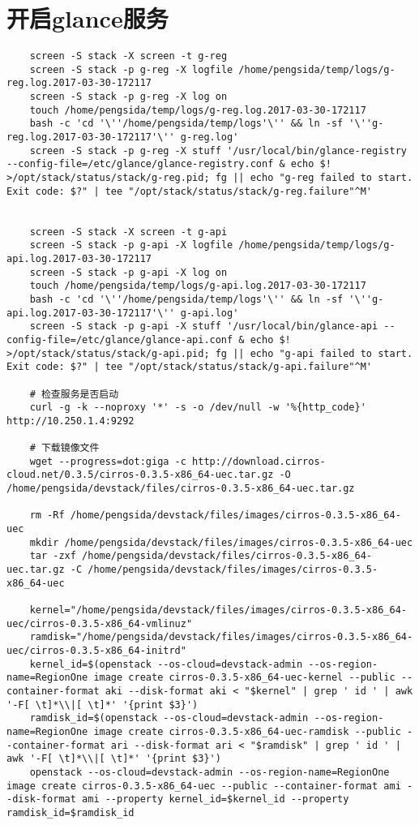 \documentclass[a4paper,left=1.5cm,right=1.5cm,11pt]{article}
\begin{document}
\section{开启glance服务}
	\begin{lstlisting}
	screen -S stack -X screen -t g-reg
	screen -S stack -p g-reg -X logfile /home/pengsida/temp/logs/g-reg.log.2017-03-30-172117
    screen -S stack -p g-reg -X log on
	touch /home/pengsida/temp/logs/g-reg.log.2017-03-30-172117
    bash -c 'cd '\''/home/pengsida/temp/logs'\'' && ln -sf '\''g-reg.log.2017-03-30-172117'\'' g-reg.log'
	screen -S stack -p g-reg -X stuff '/usr/local/bin/glance-registry --config-file=/etc/glance/glance-registry.conf & echo $! >/opt/stack/status/stack/g-reg.pid; fg || echo "g-reg failed to start. Exit code: $?" | tee "/opt/stack/status/stack/g-reg.failure"^M'

	
	screen -S stack -X screen -t g-api
	screen -S stack -p g-api -X logfile /home/pengsida/temp/logs/g-api.log.2017-03-30-172117
    screen -S stack -p g-api -X log on
	touch /home/pengsida/temp/logs/g-api.log.2017-03-30-172117
    bash -c 'cd '\''/home/pengsida/temp/logs'\'' && ln -sf '\''g-api.log.2017-03-30-172117'\'' g-api.log'
	screen -S stack -p g-api -X stuff '/usr/local/bin/glance-api --config-file=/etc/glance/glance-api.conf & echo $! >/opt/stack/status/stack/g-api.pid; fg || echo "g-api failed to start. Exit code: $?" | tee "/opt/stack/status/stack/g-api.failure"^M'

	# 检查服务是否启动
	curl -g -k --noproxy '*' -s -o /dev/null -w '%{http_code}' http://10.250.1.4:9292

	# 下载镜像文件
	wget --progress=dot:giga -c http://download.cirros-cloud.net/0.3.5/cirros-0.3.5-x86_64-uec.tar.gz -O /home/pengsida/devstack/files/cirros-0.3.5-x86_64-uec.tar.gz

	rm -Rf /home/pengsida/devstack/files/images/cirros-0.3.5-x86_64-uec
	mkdir /home/pengsida/devstack/files/images/cirros-0.3.5-x86_64-uec
    tar -zxf /home/pengsida/devstack/files/cirros-0.3.5-x86_64-uec.tar.gz -C /home/pengsida/devstack/files/images/cirros-0.3.5-x86_64-uec

	kernel="/home/pengsida/devstack/files/images/cirros-0.3.5-x86_64-uec/cirros-0.3.5-x86_64-vmlinuz"
	ramdisk="/home/pengsida/devstack/files/images/cirros-0.3.5-x86_64-uec/cirros-0.3.5-x86_64-initrd"
	kernel_id=$(openstack --os-cloud=devstack-admin --os-region-name=RegionOne image create cirros-0.3.5-x86_64-uec-kernel --public --container-format aki --disk-format aki < "$kernel" | grep ' id ' | awk '-F[ \t]*\\|[ \t]*' '{print $3}')
	ramdisk_id=$(openstack --os-cloud=devstack-admin --os-region-name=RegionOne image create cirros-0.3.5-x86_64-uec-ramdisk --public --container-format ari --disk-format ari < "$ramdisk" | grep ' id ' | awk '-F[ \t]*\\|[ \t]*' '{print $3}')
	openstack --os-cloud=devstack-admin --os-region-name=RegionOne image create cirros-0.3.5-x86_64-uec --public --container-format ami --disk-format ami --property kernel_id=$kernel_id --property ramdisk_id=$ramdisk_id
	

\end{lstlisting}
\end{document}
